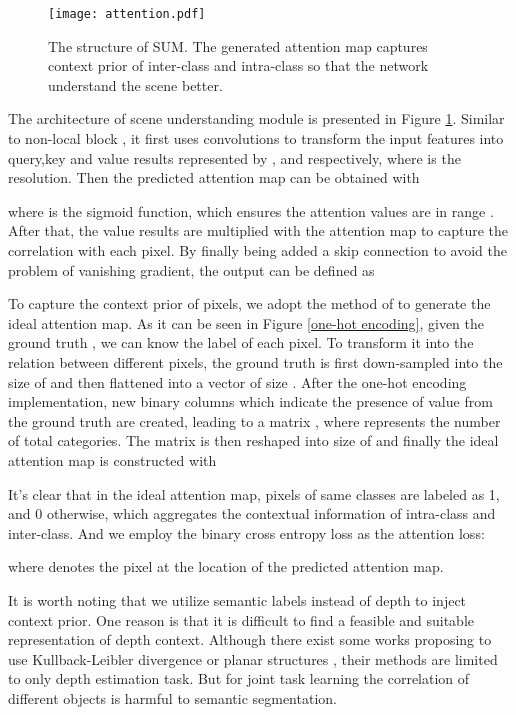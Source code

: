 \documentclass[sn-mathphys]{sn-jnl}
\theoremstyle{thmstyleone}\newtheorem{theorem}{Theorem}\newtheorem{proposition}[theorem]{Proposition}
\theoremstyle{thmstyletwo}\newtheorem{example}{Example}\newtheorem{remark}{Remark}
\theoremstyle{thmstylethree}\newtheorem{definition}{Definition}\usepackage[numbers,sort&compress]{natbib}
\begin{document}
\begin{figure}[htbp]
	\centering
	\texttt{[image: attention.pdf]}
	\caption{The structure of SUM. The generated attention map captures context prior of inter-class and intra-class so that the network understand the scene better.}
	\label{scene understanding module}
\end{figure}

The architecture of scene understanding module is presented in Figure \ref{scene understanding module}. Similar to non-local block \cite{Wang_2018}, it first uses  convolutions to transform the input features  into query,key and value results represented by ,  and  respectively, where  is the resolution. Then the predicted attention map  can be obtained with

where  is the sigmoid function, which ensures the attention values are in range . After that, the value results are multiplied with the attention map to capture the correlation with each pixel. By finally being added a skip connection to avoid the problem of vanishing gradient, the output  can be defined as


To capture the context prior of pixels, we adopt the method of \cite{Yu_2020} to generate the ideal attention map. As it can be seen in Figure \ref{one-hot encoding}, given the ground truth , we can know the label of each pixel. To transform it into the relation between different pixels, the ground truth is first down-sampled into the size of  and then flattened into a vector  of size . After the one-hot encoding implementation, new binary columns which indicate the presence of value from the ground truth are created, leading to a  matrix , where  represents the number of total categories. The matrix  is then reshaped into size of  and finally the ideal attention map  is constructed with

It's clear that in the ideal attention map, pixels of same classes are labeled as 1, and 0 otherwise, which aggregates the contextual information of intra-class and inter-class. And we employ the binary cross entropy loss as the attention loss:

where  denotes the pixel at the location  of the predicted attention map. 

It is worth noting that we utilize semantic labels instead of depth to inject context prior. One reason is that it is difficult to find a feasible and suitable representation of depth context. Although there exist some works proposing to use Kullback-Leibler divergence \cite{Chen_2021} or planar structures \cite{Huynh_2020}, their methods are limited to only depth estimation task. But for joint task learning the correlation of different objects is harmful to semantic segmentation.
\end{document}

